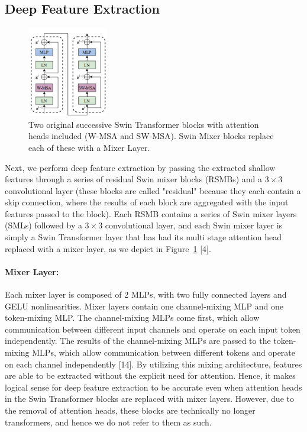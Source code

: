 \documentclass{article}
\begin{document}
\subsection{Deep Feature Extraction}

\begin{figure}\label{fig:transformer}
    \centering
    \includegraphics[width=100pt]{swin-transformer-block.png}
    \caption{Two original successive Swin Transformer blocks with attention heads included (W-MSA and SW-MSA). Swin Mixer blocks replace each of these with a Mixer Layer.}
\end{figure}

Next, we perform deep feature extraction by passing the extracted shallow features through a series of residual Swin mixer blocks (RSMBs) and a $3 \times 3$ convolutional layer (these blocks are called "residual" because they each contain a skip connection, where the results of each block are aggregated with the input features passed to the block). Each RSMB contains a series of Swin mixer layers (SMLs) followed by a $3 \times 3$ convolutional layer, and each Swin mixer layer is simply a Swin Transformer layer that has had its multi stage attention head replaced with a mixer layer, as we depict in Figure~\ref{fig:transformer} [4].

\paragraph{Mixer Layer:} Each mixer layer is composed of 2 MLPs, with two fully connected layers and GELU nonlinearities. Mixer layers contain one channel-mixing MLP and one token-mixing MLP. The channel-mixing MLPs come first, which allow communication between different input channels and operate on each input token independently. The results of the channel-mixing MLPs are passed to the token-mixing MLPs, which allow communication between different tokens and operate on each channel independently [14]. By utilizing this mixing architecture, features are able to be extracted without the explicit need for attention. Hence, it makes logical sense for deep feature extraction to be accurate even when attention heads in the Swin Transformer blocks are replaced with mixer layers. However, due to the removal of attention heads, these blocks are technically no longer transformers, and hence we do not refer to them as such.
\end{document}
